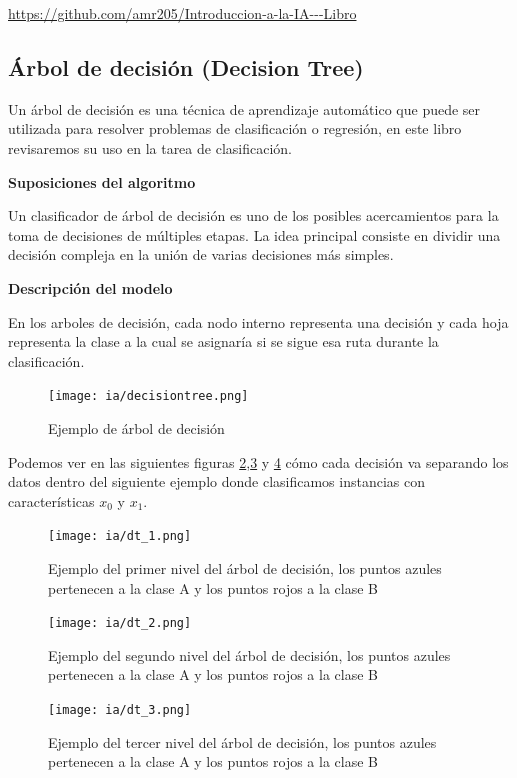 \documentclass[11pt,fleqn]{book} %
\begin{document}
\url{https://github.com/amr205/Introduccion-a-la-IA---Libro}

\subsection{Árbol de decisión (Decision Tree)} 

Un árbol de decisión es una técnica de aprendizaje automático que puede ser utilizada para resolver problemas de clasificación o regresión, en este libro revisaremos su uso en la tarea de clasificación.

\textbf{Suposiciones del algoritmo}

Un clasificador de árbol de decisión es uno de los posibles acercamientos para la toma de decisiones de múltiples etapas. La idea principal consiste en dividir una decisión compleja en la unión de varias decisiones más simples. \cite{dtc_survey}

\clearpage

\textbf{Descripción del modelo}

En los arboles de decisión, cada nodo interno representa una decisión y cada hoja representa la clase a la cual se asignaría si se sigue esa ruta durante la clasificación.

\begin{figure}[ht]
\centering\texttt{[image: ia/decisiontree.png]}
\caption{Ejemplo de árbol de decisión}

\label{fig:decisiontree} 
\end{figure}

Podemos ver en las siguientes figuras \ref{fig:decisiontree_e1},\ref{fig:decisiontree_e2} y \ref{fig:decisiontree_e3} cómo cada decisión va separando los datos dentro del siguiente ejemplo donde clasificamos instancias con características $x_0$ y $x_1$.

\begin{figure}[ht]
\centering\texttt{[image: ia/dt\_1.png]}
\caption{Ejemplo del primer nivel del árbol de decisión, los puntos azules pertenecen a la clase A y los puntos rojos a la clase B}

\label{fig:decisiontree_e1} 
\end{figure}
\FloatBarrier
\begin{figure}[ht]
\centering\texttt{[image: ia/dt\_2.png]}
\caption{Ejemplo del segundo nivel del árbol de decisión, los puntos azules pertenecen a la clase A y los puntos rojos a la clase B}

\label{fig:decisiontree_e2} 
\end{figure}
\FloatBarrier
\begin{figure}[ht]
\centering\texttt{[image: ia/dt\_3.png]}
\caption{Ejemplo del tercer nivel del árbol de decisión, los puntos azules pertenecen a la clase A y los puntos rojos a la clase B}

\label{fig:decisiontree_e3} 
\end{figure}
\FloatBarrier
\end{document}
